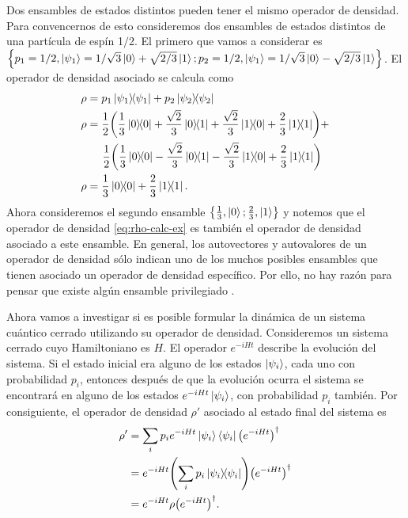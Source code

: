 Dos ensambles de estados distintos pueden tener el mismo operador
de densidad. Para convencernos de esto consideremos 
dos ensambles de estados distintos de una partícula de espín 1$/$2. 
El primero que vamos a considerar es 
$\qty{ p_1=1/2, \ket{\psi_{1} }=1/\sqrt{3}\ket{0}+\sqrt{2/3}\ket{1};
p_2=1/2, \ket{\psi_{1} }=1/\sqrt{3}\ket{0}-\sqrt{2/3}\ket{1}}$. El operador
de densidad asociado se calcula como
\begin{align}
	\rho 	&= p_1\dyad{\psi_1}{\psi_1} + 
	p_2\dyad{\psi_2}{\psi_2} \nonumber \\
	\rho	&= \frac{1}{2}\qty(\frac{1}{3}\dyad{0}{0} +
					 \frac{\sqrt{2}}{3}\dyad{0}{1} + 
					 \frac{\sqrt{2}}{3}\dyad{1}{0} +
					 \frac{2}{3}\dyad{1}{1}) + \nonumber \\
				&\hspace{5mm} \frac{1}{2}\qty(\frac{1}{3}\dyad{0}{0} -
					 \frac{\sqrt{2}}{3}\dyad{0}{1} -
					 \frac{\sqrt{2}}{3}\dyad{1}{0} +
					 \frac{2}{3}\dyad{1}{1}) \nonumber \\
	\rho	&= \frac{1}{3}\dyad{0}{0} + \frac{2}{3}\dyad{1}{1}. 
	\label{eq:rho-calc-ex}
\end{align}
Ahora consideremos el segundo ensamble $\qty{ \frac{1}{3}, \ket{0}; 
\frac{2}{3}, \ket{1}}$ y notemos que el operador de densidad 
\eqref{eq:rho-calc-ex} es también el operador de densidad asociado a
este ensamble. En general, los autovectores y autovalores de un
operador de densidad sólo indican uno de los muchos posibles ensambles
que tienen asociado un operador de densidad específico. Por ello, 
no hay razón para pensar que existe algún ensamble privilegiado 
\cite{nielsen_chuang_2011}.

Ahora vamos a investigar si es posible formular la dinámica de un sistema
cuántico cerrado utilizando su operador de densidad. 
Consideremos un sistema cerrado cuyo Hamiltoniano es $H$.
El operador $e^{-iHt}$ describe la evolución del sistema.
Si el estado inicial era alguno de los
estados $\ket{\psi_i}$, cada uno con probabilidad $p_i$, 
entonces después de que
la evolución ocurra el sistema se encontrará en alguno
de los estados $e^{-iHt}\ket{\psi_i}$, 
con probabilidad $p_i$ también. 
Por consiguiente, el operador de densidad $\rho'$ 
asociado al estado final del sistema es
\begin{align}
	\rho ' &= \sum_ip_i e^{-iHt}\Pk{i} \Pb{i}\qty(e^{-iHt})^{\dagger} \\
	&= e^{-iHt}\qty(\sum_ip_i\rhoi)\qty(e^{-iHt})^{\dagger} \\
	&= e^{-iHt}\rho\qty(e^{-iHt})^{\dagger}.
\end{align}

